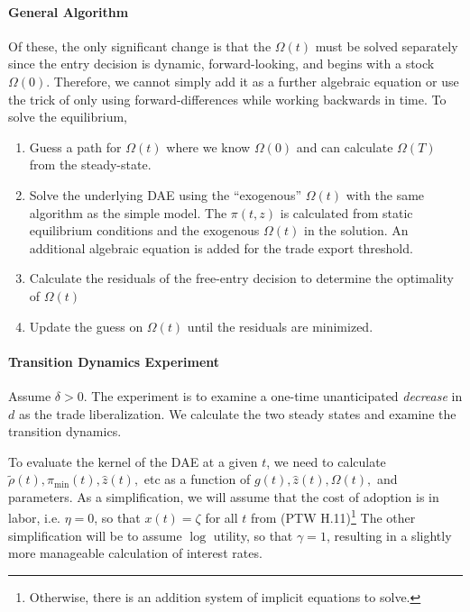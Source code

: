 \documentclass[11pt]{article}
\begin{document}
\paragraph{General Algorithm}
Of these, the only significant change is that the $\Omega(t)$ must be solved separately since the entry decision is dynamic, forward-looking, and begins with a stock $\Omega(0)$.  Therefore, we cannot simply add it as a further algebraic equation or use the trick of only using forward-differences while working backwards in time.  To solve the equilibrium,
\begin{enumerate}
	\item Guess a path for $\Omega(t)$ where we know $\Omega(0)$ and can calculate $\Omega(T)$ from the steady-state.
	\item Solve the underlying DAE using the ``exogenous'' $\Omega(t)$ with the same algorithm as the simple model.  The $\pi(t,z)$ is calculated from static equilibrium conditions and the exogenous $\Omega(t)$ in the solution.  An additional algebraic equation is added for the trade export threshold.
	\item Calculate the residuals of the free-entry decision to determine the optimality of $\Omega(t)$
	\item Update the guess on $\Omega(t)$ until the residuals are minimized.
\end{enumerate}

\paragraph{Transition Dynamics Experiment}

Assume $\delta > 0$. The experiment is to examine a one-time unanticipated \textit{decrease} in $d$ as the trade liberalization.  We calculate the two steady states and examine the transition dynamics.

To evaluate the kernel of the DAE at a given $t$, we need to calculate $\tilde{\rho}(t), \pi_{\min}(t),\hat{z}(t),$ etc  as a function of $g(t), \hat{z}(t), \Omega(t),$ and parameters.  As a simplification, we will assume that the cost of adoption is in labor, i.e. $\eta = 0$, so that $x(t) = \zeta$ for all $t$ from (PTW H.11)\footnote{Otherwise, there is an addition system of implicit equations to solve.}  The other simplification will be to assume $\log$ utility, so that $\gamma = 1$, resulting in a slightly more manageable calculation of interest rates.
\end{document}
